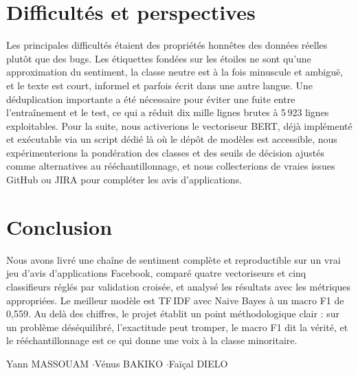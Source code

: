 \documentclass[11pt,a4paper]{article}
\begin{document}
\section{Difficultés et perspectives}
Les principales difficultés étaient des propriétés honnêtes des données réelles plutôt
que des bugs. Les étiquettes fondées sur les étoiles ne sont qu'une approximation du
sentiment, la classe neutre est à la fois minuscule et ambiguë, et le texte est court,
informel et parfois écrit dans une autre langue. Une déduplication importante a été
nécessaire pour éviter une fuite entre l'entraînement et le test, ce qui a réduit dix
mille lignes brutes à 5\,923 lignes exploitables. Pour la suite, nous activerions le
vectoriseur BERT, déjà implémenté et exécutable via un script dédié là où le dépôt de
modèles est accessible, nous expérimenterions la pondération des classes et des seuils
de décision ajustés comme alternatives au rééchantillonnage, et nous collecterions de
vraies issues GitHub ou JIRA pour compléter les avis d'applications.

\section{Conclusion}
Nous avons livré une chaîne de sentiment complète et reproductible sur un vrai jeu
d'avis d'applications Facebook, comparé quatre vectoriseurs et cinq classifieurs réglés
par validation croisée, et analysé les résultats avec les métriques appropriées. Le
meilleur modèle est TF\,IDF avec Naive Bayes à un macro F1 de 0,559. Au delà des
chiffres, le projet établit un point méthodologique clair : sur un problème
déséquilibré, l'exactitude peut tromper, le macro F1 dit la vérité, et le
rééchantillonnage est ce qui donne une voix à la classe minoritaire.

\vfill
\begin{center}
\small\textcolor{primary}{Yann MASSOUAM \quad$\cdot$\quad Vénus BAKIKO \quad$\cdot$\quad Faïçal DIELO}
\end{center}
\end{document}
